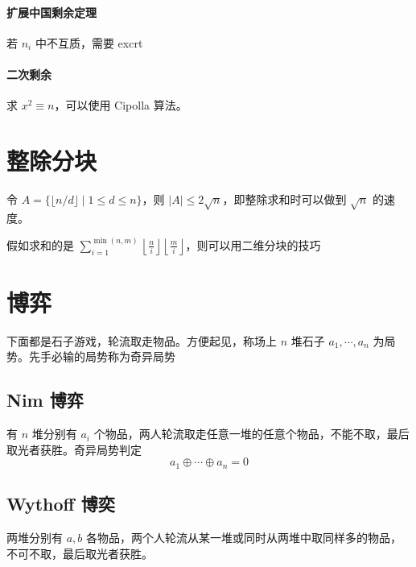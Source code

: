 \documentclass{probook}
\begin{document}
\begin{multicols}{2}
\paragraph{扩展中国剩余定理}
若 $n_i$ 中不互质，需要 excrt


\paragraph{二次剩余} 求 $x^2 \equiv n$，可以使用 Cipolla 算法。



\section{整除分块}
令 $A = \{ \lfloor n/d \rfloor \mid 1 \leqslant d \leqslant n \}$，则 $|A| \leqslant 2\sqrt{n}$，即整除求和时可以做到 $\sqrt{n}$ 的速度。



假如求和的是 $\sum\limits_{i=1}^{\min(n,m)} \left\lfloor \frac{n}{i} \right\rfloor\left\lfloor \frac{m}{i} \right\rfloor$，则可以用二维分块的技巧




\section{博弈}

下面都是石子游戏，轮流取走物品。方便起见，称场上 $n$ 堆石子 $a_1,\cdots,a_n$ 为局势。先手必输的局势称为奇异局势

\subsection{Nim 博弈}

有 $n$ 堆分别有 $a_i$ 个物品，两人轮流取走任意一堆的任意个物品，不能不取，最后取光者获胜。奇异局势判定
\[a_1 \oplus \cdots \oplus a_n =0\]

\subsection{Wythoff 博奕}

两堆分别有 $a,b$ 各物品，两个人轮流从某一堆或同时从两堆中取同样多的物品，不可不取，最后取光者获胜。




\end{multicols}
\end{document}
